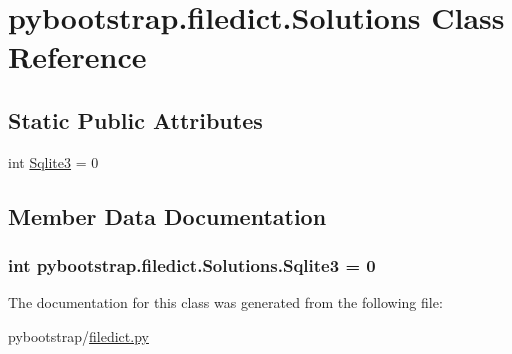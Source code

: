 \hypertarget{classpybootstrap_1_1filedict_1_1Solutions}{\section{pybootstrap.\-filedict.\-Solutions Class Reference}
\label{classpybootstrap_1_1filedict_1_1Solutions}
}
\subsection*{Static Public Attributes}
\begin{DoxyCompactItemize}
\item 
int \hyperlink{classpybootstrap_1_1filedict_1_1Solutions_a51fdb14abcdf5e7879022499ab199201}{Sqlite3} = 0
\end{DoxyCompactItemize}


\subsection{Member Data Documentation}
\hypertarget{classpybootstrap_1_1filedict_1_1Solutions_a51fdb14abcdf5e7879022499ab199201}{
\subsubsection[{Sqlite3}]{\setlength{\rightskip}{0pt plus 5cm}int pybootstrap.\-filedict.\-Solutions.\-Sqlite3 = 0\hspace{0.3cm}{\ttfamily [static]}}}\label{classpybootstrap_1_1filedict_1_1Solutions_a51fdb14abcdf5e7879022499ab199201}


The documentation for this class was generated from the following file\-:\begin{DoxyCompactItemize}
\item 
pybootstrap/\hyperlink{filedict_8py}{filedict.\-py}\end{DoxyCompactItemize}
